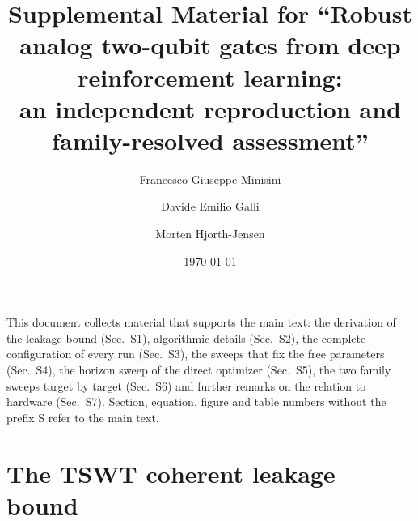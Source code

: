 \documentclass[aps,prx,twocolumn,superscriptaddress,nofootinbib,amsmath,amssymb,floatfix]{revtex4-2}
\begin{document}
\title{Supplemental Material for ``Robust analog two-qubit gates from deep reinforcement learning:\\
an independent reproduction and family-resolved assessment''}

\author{Francesco Giuseppe Minisini}
\author{Davide Emilio Galli}
\author{Morten Hjorth-Jensen}

\date{\today}

\maketitle

\renewcommand{\thesection}{S\arabic{section}}
\renewcommand{\thesubsection}{\arabic{subsection}}
\renewcommand{\theequation}{S\arabic{equation}}
\renewcommand{\thefigure}{S\arabic{figure}}
\renewcommand{\thetable}{S\arabic{table}}

This document collects material that supports the main text: the derivation of the leakage bound
(Sec.~S1), algorithmic details (Sec.~S2), the complete configuration of every run (Sec.~S3), the sweeps
that fix the free parameters (Sec.~S4), the horizon sweep of the direct optimizer (Sec.~S5), the two
family sweeps target by target (Sec.~S6) and further remarks on the relation to hardware (Sec.~S7).
Section, equation, figure and table numbers without the prefix S refer to the main text.

\section{The TSWT coherent leakage bound}
\label{app:tswt}
\end{document}
